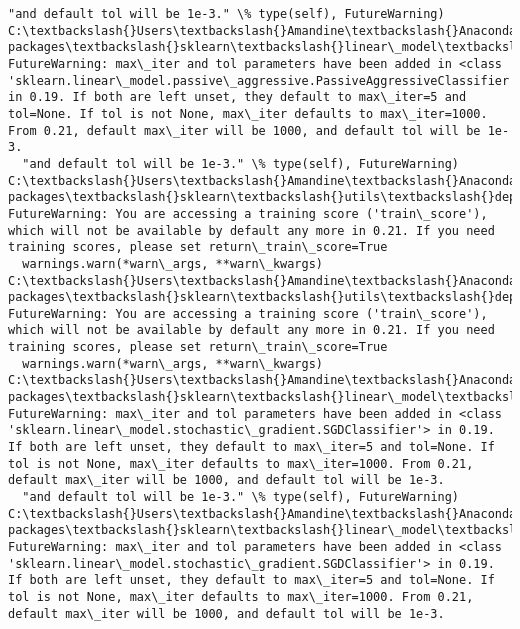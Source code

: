\documentclass[11pt]{article}
\begin{document}
\begin{Verbatim}[commandchars=\\\{\}]
  "and default tol will be 1e-3." \% type(self), FutureWarning)
C:\textbackslash{}Users\textbackslash{}Amandine\textbackslash{}Anaconda3\textbackslash{}lib\textbackslash{}site-packages\textbackslash{}sklearn\textbackslash{}linear\_model\textbackslash{}stochastic\_gradient.py:128: FutureWarning: max\_iter and tol parameters have been added in <class 'sklearn.linear\_model.passive\_aggressive.PassiveAggressiveClassifier'> in 0.19. If both are left unset, they default to max\_iter=5 and tol=None. If tol is not None, max\_iter defaults to max\_iter=1000. From 0.21, default max\_iter will be 1000, and default tol will be 1e-3.
  "and default tol will be 1e-3." \% type(self), FutureWarning)
C:\textbackslash{}Users\textbackslash{}Amandine\textbackslash{}Anaconda3\textbackslash{}lib\textbackslash{}site-packages\textbackslash{}sklearn\textbackslash{}utils\textbackslash{}deprecation.py:122: FutureWarning: You are accessing a training score ('train\_score'), which will not be available by default any more in 0.21. If you need training scores, please set return\_train\_score=True
  warnings.warn(*warn\_args, **warn\_kwargs)
C:\textbackslash{}Users\textbackslash{}Amandine\textbackslash{}Anaconda3\textbackslash{}lib\textbackslash{}site-packages\textbackslash{}sklearn\textbackslash{}utils\textbackslash{}deprecation.py:122: FutureWarning: You are accessing a training score ('train\_score'), which will not be available by default any more in 0.21. If you need training scores, please set return\_train\_score=True
  warnings.warn(*warn\_args, **warn\_kwargs)
C:\textbackslash{}Users\textbackslash{}Amandine\textbackslash{}Anaconda3\textbackslash{}lib\textbackslash{}site-packages\textbackslash{}sklearn\textbackslash{}linear\_model\textbackslash{}stochastic\_gradient.py:128: FutureWarning: max\_iter and tol parameters have been added in <class 'sklearn.linear\_model.stochastic\_gradient.SGDClassifier'> in 0.19. If both are left unset, they default to max\_iter=5 and tol=None. If tol is not None, max\_iter defaults to max\_iter=1000. From 0.21, default max\_iter will be 1000, and default tol will be 1e-3.
  "and default tol will be 1e-3." \% type(self), FutureWarning)
C:\textbackslash{}Users\textbackslash{}Amandine\textbackslash{}Anaconda3\textbackslash{}lib\textbackslash{}site-packages\textbackslash{}sklearn\textbackslash{}linear\_model\textbackslash{}stochastic\_gradient.py:128: FutureWarning: max\_iter and tol parameters have been added in <class 'sklearn.linear\_model.stochastic\_gradient.SGDClassifier'> in 0.19. If both are left unset, they default to max\_iter=5 and tol=None. If tol is not None, max\_iter defaults to max\_iter=1000. From 0.21, default max\_iter will be 1000, and default tol will be 1e-3.

\end{Verbatim}
\end{document}
